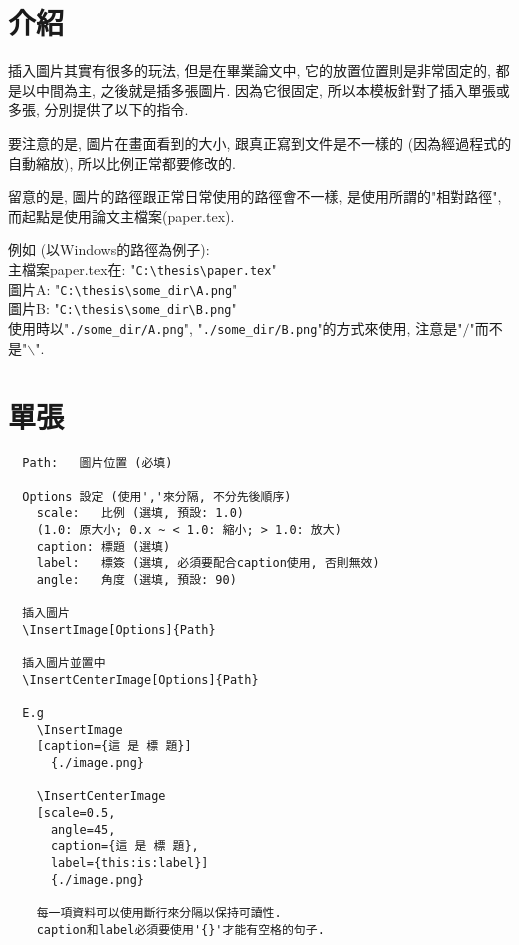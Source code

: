 \section{介紹}

插入圖片其實有很多的玩法, 但是在畢業論文中, 它的放置位置則是非常固定的, 都是以中間為主, 之後就是插多張圖片. 因為它很固定, 所以本模板針對了插入單張或多張, 分別提供了以下的指令.

要注意的是, 圖片在畫面看到的大小, 跟真正寫到文件是不一樣的 (因為經過程式的自動縮放), 所以比例正常都要修改的.

留意的是, 圖片的路徑跟正常日常使用的路徑會不一樣, 是使用所謂的"相對路徑", 而起點是使用論文主檔案(paper.tex).

\noindent 例如 (以Windows的路徑為例子):\\
主檔案paper.tex在: "\verb|C:\thesis\paper.tex|"\\
圖片A: "\verb|C:\thesis\some_dir\A.png|"\\
圖片B: "\verb|C:\thesis\some_dir\B.png|"\\
使用時以"\verb|./some_dir/A.png|", "\verb|./some_dir/B.png|"的方式來使用, 注意是"$/$"而不是"$\backslash$".


\newpage
\section{單張}

  \begin{framed}
  \begin{verbatim}
  Path:   圖片位置 (必填)

  Options 設定 (使用','來分隔, 不分先後順序)
    scale:   比例 (選填, 預設: 1.0)
    (1.0: 原大小; 0.x ~ < 1.0: 縮小; > 1.0: 放大)
    caption: 標題 (選填)
    label:   標簽 (選填, 必須要配合caption使用, 否則無效)
    angle:   角度 (選填, 預設: 90)

  插入圖片
  \InsertImage[Options]{Path}

  插入圖片並置中
  \InsertCenterImage[Options]{Path}

  E.g
    \InsertImage
    [caption={這 是 標 題}]
      {./image.png}

    \InsertCenterImage
    [scale=0.5,
      angle=45,
      caption={這 是 標 題},
      label={this:is:label}]
      {./image.png}

    每一項資料可以使用斷行來分隔以保持可讀性.
    caption和label必須要使用'{}'才能有空格的句子.
  \end{verbatim}
  \end{framed}


